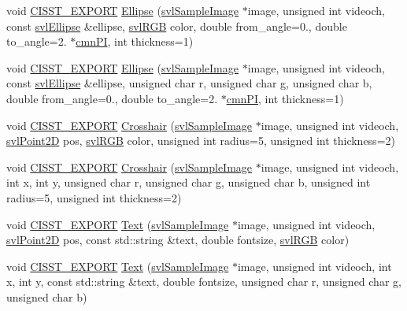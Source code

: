 \begin{DoxyCompactItemize}
\item 
void \hyperlink{cmn_export_macros_8h_a99393e0c3ac434b2605235bbe20684f8}{C\-I\-S\-S\-T\-\_\-\-E\-X\-P\-O\-R\-T} \hyperlink{namespacesvl_draw_a84f749381c20f93a16c05870dc8f59f3}{Ellipse} (\hyperlink{classsvl_sample_image}{svl\-Sample\-Image} $\ast$image, unsigned int videoch, const \hyperlink{structsvl_ellipse}{svl\-Ellipse} \&ellipse, \hyperlink{structsvl_r_g_b}{svl\-R\-G\-B} color, double from\-\_\-angle=0., double to\-\_\-angle=2. $\ast$\hyperlink{cmn_constants_8h_aceb5aee49c7545745836d307b9b671ec}{cmn\-P\-I}, int thickness=1)
\item 
void \hyperlink{cmn_export_macros_8h_a99393e0c3ac434b2605235bbe20684f8}{C\-I\-S\-S\-T\-\_\-\-E\-X\-P\-O\-R\-T} \hyperlink{namespacesvl_draw_a51d362f4450514dbbf8ad2d41fef6c4a}{Ellipse} (\hyperlink{classsvl_sample_image}{svl\-Sample\-Image} $\ast$image, unsigned int videoch, const \hyperlink{structsvl_ellipse}{svl\-Ellipse} \&ellipse, unsigned char r, unsigned char g, unsigned char b, double from\-\_\-angle=0., double to\-\_\-angle=2. $\ast$\hyperlink{cmn_constants_8h_aceb5aee49c7545745836d307b9b671ec}{cmn\-P\-I}, int thickness=1)
\item 
void \hyperlink{cmn_export_macros_8h_a99393e0c3ac434b2605235bbe20684f8}{C\-I\-S\-S\-T\-\_\-\-E\-X\-P\-O\-R\-T} \hyperlink{namespacesvl_draw_a1c674a4f1d623089f5ecdd08f12e2e17}{Crosshair} (\hyperlink{classsvl_sample_image}{svl\-Sample\-Image} $\ast$image, unsigned int videoch, \hyperlink{structsvl_point2_d}{svl\-Point2\-D} pos, \hyperlink{structsvl_r_g_b}{svl\-R\-G\-B} color, unsigned int radius=5, unsigned int thickness=2)
\item 
void \hyperlink{cmn_export_macros_8h_a99393e0c3ac434b2605235bbe20684f8}{C\-I\-S\-S\-T\-\_\-\-E\-X\-P\-O\-R\-T} \hyperlink{namespacesvl_draw_a29c9b57fd19395200fbb152ea5758147}{Crosshair} (\hyperlink{classsvl_sample_image}{svl\-Sample\-Image} $\ast$image, unsigned int videoch, int x, int y, unsigned char r, unsigned char g, unsigned char b, unsigned int radius=5, unsigned int thickness=2)
\item 
void \hyperlink{cmn_export_macros_8h_a99393e0c3ac434b2605235bbe20684f8}{C\-I\-S\-S\-T\-\_\-\-E\-X\-P\-O\-R\-T} \hyperlink{namespacesvl_draw_a9be269ab4f2430080692ef0f3424fe17}{Text} (\hyperlink{classsvl_sample_image}{svl\-Sample\-Image} $\ast$image, unsigned int videoch, \hyperlink{structsvl_point2_d}{svl\-Point2\-D} pos, const std\-::string \&text, double fontsize, \hyperlink{structsvl_r_g_b}{svl\-R\-G\-B} color)
\item 
void \hyperlink{cmn_export_macros_8h_a99393e0c3ac434b2605235bbe20684f8}{C\-I\-S\-S\-T\-\_\-\-E\-X\-P\-O\-R\-T} \hyperlink{namespacesvl_draw_a6c7a6c4a6ebae53fa327000c995a6ed5}{Text} (\hyperlink{classsvl_sample_image}{svl\-Sample\-Image} $\ast$image, unsigned int videoch, int x, int y, const std\-::string \&text, double fontsize, unsigned char r, unsigned char g, unsigned char b)

\end{DoxyCompactItemize}
